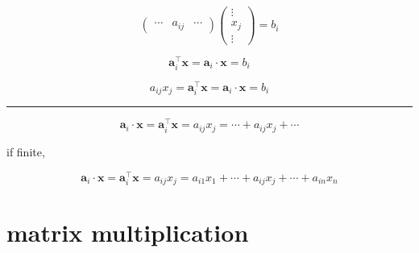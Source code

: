 \documentclass[
]{book}
\theoremstyle{definition}
\theoremstyle{definition}
\theoremstyle{definition}
\theoremstyle{definition}
\theoremstyle{remark}
\begin{document}
\[
\begin{pmatrix}\cdots & a_{{\scriptscriptstyle ij}} & \cdots\end{pmatrix}\begin{pmatrix}\vdots\\
x_{{\scriptscriptstyle j}}\\
\vdots
\end{pmatrix}=b_{{\scriptscriptstyle i}}
\]

\[
\boldsymbol{a}_{{\scriptscriptstyle i}}^{\intercal}\boldsymbol{x}=\boldsymbol{a}_{{\scriptscriptstyle i}}\cdot\boldsymbol{x}=b_{i}
\]

\[
a_{{\scriptscriptstyle ij}}x_{{\scriptscriptstyle j}}=\boldsymbol{a}_{{\scriptscriptstyle i}}^{\intercal}\boldsymbol{x}=\boldsymbol{a}_{{\scriptscriptstyle i}}\cdot\boldsymbol{x}=b_{i}
\]

\begin{center}\rule{0.5\linewidth}{0.5pt}\end{center}

\[
\boldsymbol{a}_{{\scriptscriptstyle i}}\cdot\boldsymbol{x}=\boldsymbol{a}_{{\scriptscriptstyle i}}^{\intercal}\boldsymbol{x}=a_{{\scriptscriptstyle ij}}x_{{\scriptscriptstyle j}}=\cdots+a_{{\scriptscriptstyle ij}}x_{{\scriptscriptstyle j}}+\cdots
\]

if finite,

\[
\boldsymbol{a}_{{\scriptscriptstyle i}}\cdot\boldsymbol{x}=\boldsymbol{a}_{{\scriptscriptstyle i}}^{\intercal}\boldsymbol{x}=a_{{\scriptscriptstyle ij}}x_{{\scriptscriptstyle j}}=a_{{\scriptscriptstyle i1}}x_{{\scriptscriptstyle 1}}+\cdots+a_{{\scriptscriptstyle ij}}x_{{\scriptscriptstyle j}}+\cdots+a_{{\scriptscriptstyle in}}x_{{\scriptscriptstyle n}}
\]

\section{matrix multiplication}\label{matrix-multiplication}
\end{document}
